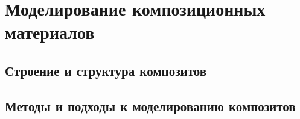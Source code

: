 \section{Моделирование композиционных материалов}

\subsection{Строение и структура композитов}

\subsection{Методы и подходы к моделированию композитов}

